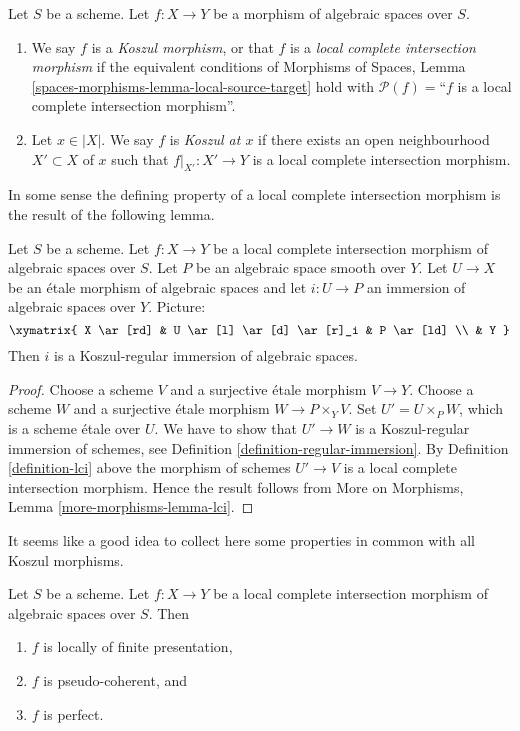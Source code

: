 \begin{definition}
\label{definition-lci}
Let $S$ be a scheme.
Let $f : X \to Y$ be a morphism of algebraic spaces over $S$.
\begin{enumerate}
\item We say $f$ is a {\it Koszul morphism}, or that $f$ is a
{\it local complete intersection morphism} if the equivalent conditions of
Morphisms of Spaces, Lemma \ref{spaces-morphisms-lemma-local-source-target}
hold with $\mathcal{P}(f) =$``$f$ is a local complete intersection morphism''.
\item Let $x \in |X|$. We say $f$ is {\it Koszul at $x$} if
there exists an open neighbourhood $X' \subset X$ of $x$ such
that $f|_{X'} : X' \to Y$ is a local complete intersection morphism.
\end{enumerate}
\end{definition}

\noindent
In some sense the defining property of a local complete intersection
morphism is the result of the following lemma.

\begin{lemma}
\label{lemma-lci}
Let $S$ be a scheme.
Let $f : X \to Y$ be a local complete intersection morphism
of algebraic spaces over $S$.
Let $P$ be an algebraic space smooth over $Y$.
Let $U \to X$ be an \'etale morphism of algebraic spaces
and let $i : U \to P$ an immersion of algebraic spaces over $Y$.
Picture:
$$
\xymatrix{
X \ar[rd] & U \ar[l] \ar[d] \ar[r]_i & P \ar[ld] \\
& Y
}
$$
Then $i$ is a Koszul-regular immersion of algebraic spaces.
\end{lemma}

\begin{proof}
Choose a scheme $V$ and a surjective \'etale morphism $V \to Y$.
Choose a scheme $W$ and a surjective \'etale morphism $W \to P \times_Y V$.
Set $U' = U \times_P W$, which is a scheme \'etale over $U$.
We have to show that $U' \to W$ is a Koszul-regular immersion of
schemes, see
Definition \ref{definition-regular-immersion}.
By
Definition \ref{definition-lci}
above the morphism of schemes $U' \to V$ is a local complete intersection
morphism. Hence the result follows from
More on Morphisms, Lemma \ref{more-morphisms-lemma-lci}.
\end{proof}

\noindent
It seems like a good idea to collect here some properties in common
with all Koszul morphisms.

\begin{lemma}
\label{lemma-lci-properties}
Let $S$ be a scheme. Let $f : X \to Y$ be a local complete intersection
morphism of algebraic spaces over $S$. Then
\begin{enumerate}
\item $f$ is locally of finite presentation,
\item $f$ is pseudo-coherent, and
\item $f$ is perfect.
\end{enumerate}
\end{lemma}

